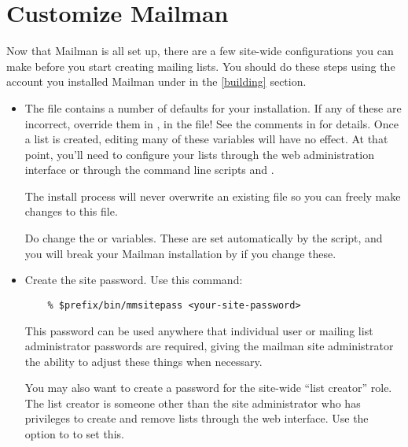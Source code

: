 \documentclass{howto}
\begin{document}
\section{Customize Mailman\label{customizing}}

Now that Mailman is all set up, there are a few site-wide configurations you
can make before you start creating mailing lists.  You should do these steps
using the account you installed Mailman under in the \ref{building} section.

\begin{itemize}
\item The file  contains a number of
      defaults for your installation.  If any of these are incorrect, override
      them in ,  in the
       file!  See the comments in  for
      details.  Once a list is created, editing many of these variables will
      have no effect.  At that point, you'll need to configure your lists
      through the web administration interface or through the command line
      scripts  and .

      The install process will never overwrite an existing 
      file so you can freely make changes to this file.

      \begin{notice}[note]
      Do  change the  or 
      variables.  These are set automatically by the 
      script, and you will break your Mailman installation by if you change
      these.
      \end{notice}
\item Create the site password.  Use this command:

\begin{verbatim}
    % $prefix/bin/mmsitepass <your-site-password>
\end{verbatim}

    This password can be used anywhere that individual user or mailing list
    administrator passwords are required, giving the mailman site
    administrator the ability to adjust these things when necessary.

    You may also want to create a password for the site-wide ``list creator''
    role.  The list creator is someone other than the site administrator who
    has privileges to create and remove lists through the web interface.  Use
    the  option to  to set this.

\end{itemize}
\end{document}

